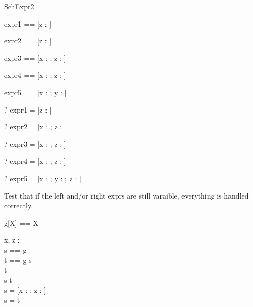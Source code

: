 \begin{zsection}
  \SECTION SchExpr2
\end{zsection}

\begin{zed} expr1 == [z : \nat] \land [z : \nat] \end{zed}
\begin{zed} expr2 == [z : \nat]  \end{zed}
\begin{zed} expr3 == [x : \nat; z : \nat] \land [z : \nat] \end{zed}
\begin{zed} expr4 == [x : \nat; z : \nat]  \end{zed}
\begin{zed} expr5 == [x : \nat; y : \nat] \land [z : \nat] \end{zed}

\begin{zed} \vdash? expr1 = [z : \nat] \end{zed}
\begin{zed} \vdash? expr2 = [x : \nat; z : \nat] \end{zed}
\begin{zed} \vdash? expr3 = [x : \nat; z : \nat] \end{zed}
\begin{zed} \vdash? expr4 = [x : \nat; z : \nat] \end{zed}
\begin{zed} \vdash? expr5 = [x : \nat; y : \nat; z : \nat] \end{zed}

Test that if the left and/or right exprs are still varaible, everything 
is handled correctly.
\begin{zed}
  g[X] == X
\end{zed}

\begin{axdef}
  x, z : \nat\\
  s == g\\
  t == g
\where
  s \land [x : \nat]\\
  [z : \nat] \land t\\
  s \land t\\
  s = [x : \nat; z : \nat]\\
  s = t
\end{axdef}
